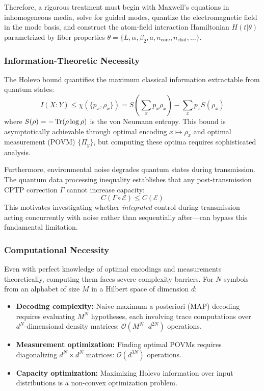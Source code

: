 \documentclass[12pt,a4paper]{article}
\newcommand{\cE}{\mathcal{E}}
\begin{document}
Therefore, a rigorous treatment must begin with Maxwell's equations in inhomogeneous media, solve for guided modes, quantize the electromagnetic field in the mode basis, and construct the atom-field interaction Hamiltonian $H(t|\theta)$ parametrized by fiber properties $\theta = \{L, \alpha, \beta_2, a, n_{\text{core}}, n_{\text{clad}}, \ldots\}$.

\subsubsection{Information-Theoretic Necessity}

The Holevo bound quantifies the maximum classical information extractable from quantum states:
\begin{equation}
I(X : Y) \leq \chi(\{p_x, \rho_x\}) = S\left(\sum_x p_x \rho_x\right) - \sum_x p_x S(\rho_x)
\end{equation}
where $S(\rho) = -\Tr(\rho \log \rho)$ is the von Neumann entropy. This bound is asymptotically achievable through optimal encoding $x \mapsto \rho_x$ and optimal measurement (POVM) $\{\Pi_y\}$, but computing these optima requires sophisticated analysis.

Furthermore, environmental noise degrades quantum states during transmission. The quantum data processing inequality establishes that any post-transmission CPTP correction $\Gamma$ cannot increase capacity:
\begin{equation}
C(\Gamma \circ \cE) \leq C(\cE)
\end{equation}
This motivates investigating whether \emph{integrated} control during transmission—acting concurrently with noise rather than sequentially after—can bypass this fundamental limitation.

\subsubsection{Computational Necessity}

Even with perfect knowledge of optimal encodings and measurements theoretically, computing them faces severe complexity barriers. For $N$ symbols from an alphabet of size $M$ in a Hilbert space of dimension $d$:

\begin{itemize}
\item \textbf{Decoding complexity:} Naive maximum a posteriori (MAP) decoding requires evaluating $M^N$ hypotheses, each involving trace computations over $d^N$-dimensional density matrices: $\mathcal{O}(M^N \cdot d^{2N})$ operations.

\item \textbf{Measurement optimization:} Finding optimal POVMs requires diagonalizing $d^N \times d^N$ matrices: $\mathcal{O}(d^{3N})$ operations.

\item \textbf{Capacity optimization:} Maximizing Holevo information over input distributions is a non-convex optimization problem.
\end{itemize}
\end{document}
